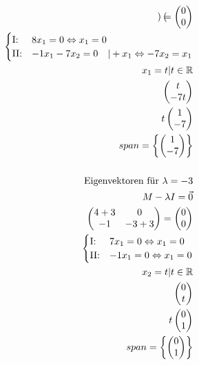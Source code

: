 \begin{align*}
\begin{pmatrix}
    \end{pmatrix} = \begin{pmatrix}
        0 \\ 0
    \end{pmatrix} \\
    \begin{cases}
        \text{I:\@} & 8x_1 = 0 \Leftrightarrow x_1 = 0\\
        \text{II:\@} & -1x_1 -7x_2 = 0 \quad | + x_1 \Leftrightarrow -7x_2 = x_1
    \end{cases} \\
    x_1 = t | t \in \mathbb{R} \\
    \begin{pmatrix}
        t \\ -7t 
    \end{pmatrix} \\
    t \begin{pmatrix}
        1 \\ -7
    \end{pmatrix} \\
    span = \left\{\begin{pmatrix}
        1 \\ -7
    \end{pmatrix}\right\} \\\\
    \text{Eigenvektoren für } \lambda = -3 \\
    M - \lambda I = \vec{0} \\
    \begin{pmatrix}
        4 + 3 & 0 \\ -1 & -3 + 3
    \end{pmatrix} = \begin{pmatrix}
        0 \\ 0
    \end{pmatrix} \\
    \begin{cases}
        \text{I:\@} & 7x_1 = 0 \Leftrightarrow x_1 = 0 \\
        \text{II:\@} & -1x_1 = 0 \Leftrightarrow x_1 = 0
    \end{cases} \\
    x_2 = t | t \in \mathbb{R} \\
    \begin{pmatrix}
        0 \\ t
    \end{pmatrix} \\
    t \begin{pmatrix}
        0 \\ 1
    \end{pmatrix} \\
    span = \left\{\begin{pmatrix}
        0 \\ 1
    \end{pmatrix}\right\}
\end{align*}


